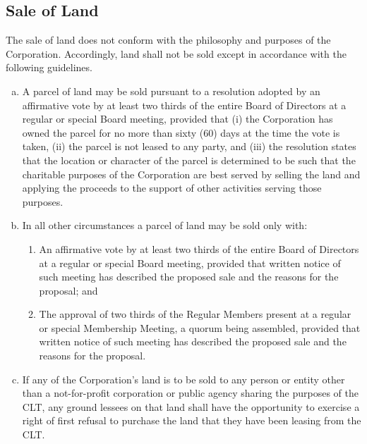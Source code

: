 \subsection{Sale of Land}
The sale of land does not conform with the philosophy and purposes of
the Corporation. Accordingly, land shall not be sold except in
accordance with the following guidelines.
\begin{enumerate}[a.]
\item A parcel of land may be sold pursuant to a resolution adopted by
  an affirmative vote by at least two thirds of the entire Board of
  Directors at a regular or special Board meeting, provided that (i)
  the Corporation has owned the parcel for no more than sixty (60)
  days at the time the vote is taken, (ii) the parcel is not leased to
  any party, and (iii) the resolution states that the location or
  character of the parcel is determined to be such that the charitable
  purposes of the Corporation are best served by selling the land and
  applying the proceeds to the support of other activities serving
  those purposes.
\item In all other circumstances a parcel of land may be sold only with:
  \begin{enumerate}[(1)]
    \item An affirmative vote by at least two thirds of the entire
      Board of Directors at a regular or special Board meeting,
      provided that written notice of such meeting has described the
      proposed sale and the reasons for the proposal; and
    \item The approval of two thirds of the Regular Members present at
      a regular or special Membership Meeting, a quorum being
      assembled, provided that written notice of such meeting has
      described the proposed sale and the reasons for the proposal.
  \end{enumerate}
  \item If any of the Corporation's land is to be sold to any person
    or entity other than a not-for-profit corporation or public agency
    sharing the purposes of the CLT, any ground lessees on that land
    shall have the opportunity to exercise a right of first refusal to
    purchase the land that they have been leasing from the CLT.
\end{enumerate}

